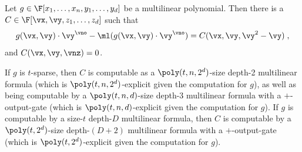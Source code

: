 \documentclass{toc}
\begin{document}
\begin{lemma}\label{res:multilin:mon_formula}
        Let $g\in\F[x_1,\ldots,x_n,y_1,\ldots,y_d]$ be a multilinear polynomial. Then there is a $C\in\F[\vx,\vy,z_1,\ldots,z_d]$ such that
        \[
                g(\vx,\vy)\cdot \vy^\vno-\ml(g(\vx,\vy)\cdot \vy^\vno)
                =C(\vx,\vy,\vy^2-\vy)
                \;,
        \]
        and $C(\vx,\vy,\vnz)=0$.

        If $g$ is $t$-sparse, then $C$ is computable as a $\poly(t,n,2^d)$-size depth-2 multilinear formula (which is $\poly(t,n,2^d)$-explicit given the computation for $g$), as well as being computable by a $\poly(t,n,d)$-size depth-3 multilinear formula with a $+$-output-gate (which is $\poly(t,n,d)$-explicit given the computation for $g$).  If $g$ is computable by a size-$t$ depth-$D$ multilinear formula, then $C$ is computable by a $\poly(t,2^d)$-size depth-$(D+2)$ multilinear formula with a $+$-output-gate (which is $\poly(t,2^d)$-explicit given the computation for $g$).
\end{lemma}
\end{document}
